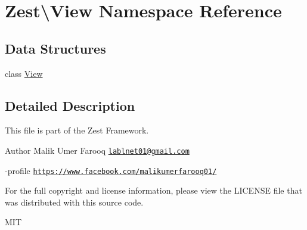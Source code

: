 \hypertarget{namespace_zest_1_1_view}{}\section{Zest\textbackslash{}View Namespace Reference}
\label{namespace_zest_1_1_view}
\subsection*{Data Structures}
\begin{DoxyCompactItemize}
\item 
class \mbox{\hyperlink{class_zest_1_1_view_1_1_view}{View}}
\end{DoxyCompactItemize}


\subsection{Detailed Description}
This file is part of the Zest Framework.

\begin{DoxyAuthor}{Author}
Malik Umer Farooq \href{mailto:lablnet01@gmail.com}{\tt lablnet01@gmail.\+com} 

-\/profile \href{https://www.facebook.com/malikumerfarooq01/}{\tt https\+://www.\+facebook.\+com/malikumerfarooq01/}
\end{DoxyAuthor}
For the full copyright and license information, please view the L\+I\+C\+E\+N\+SE file that was distributed with this source code.

M\+IT 